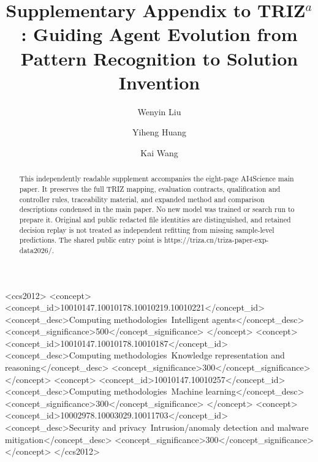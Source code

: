 \documentclass[manuscript,screen,nonacm]{acmart}
\begin{document}
\newcommand{\triza}{TRIZ$^a$}
\newcommand{\papertitle}{\triza: Guiding Agent Evolution from Pattern Recognition to Solution Invention}
\newcommand{\complete}{\textcolor{trizgreen}{\textbf{complete}}}
\newcommand{\withheld}{\textcolor{trizmagenta}{\textbf{not promoted}}}

\title[TRIZa Supplementary Appendix]{Supplementary Appendix to \papertitle}


\author{Wenyin Liu}

\author{Yiheng Huang}

\author{Kai Wang}

\renewcommand{\shortauthors}{Liu et al.}

\begin{abstract}
This independently readable supplement accompanies the eight-page AI4Science
main paper. It preserves the full TRIZ mapping, evaluation contracts,
qualification and controller rules, traceability material, and expanded
method and comparison descriptions condensed in the main paper.
No new model was trained or search run to prepare it. Original and public
redacted file identities are distinguished, and retained decision replay
is not treated as independent refitting from missing sample-level predictions.
The shared public entry point is https://triza.cn/triza-paper-exp-data2026/.
\end{abstract}

\begin{CCSXML}
<ccs2012>
<concept>
<concept_id>10010147.10010178.10010219.10010221</concept_id>
<concept_desc>Computing methodologies~Intelligent agents</concept_desc>
<concept_significance>500</concept_significance>
</concept>
<concept>
<concept_id>10010147.10010178.10010187</concept_id>
<concept_desc>Computing methodologies~Knowledge representation and reasoning</concept_desc>
<concept_significance>300</concept_significance>
</concept>
<concept>
<concept_id>10010147.10010257</concept_id>
<concept_desc>Computing methodologies~Machine learning</concept_desc>
<concept_significance>300</concept_significance>
</concept>
<concept>
<concept_id>10002978.10003029.10011703</concept_id>
<concept_desc>Security and privacy~Intrusion/anomaly detection and malware mitigation</concept_desc>
<concept_significance>300</concept_significance>
</concept>
</ccs2012>
\end{CCSXML}
\end{document}
